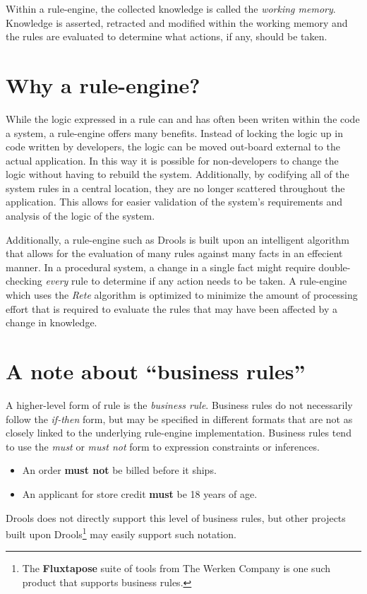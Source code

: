 Within a rule-engine, the collected knowledge is called the
\emph{working memory}.  Knowledge is
asserted, retracted and modified within the working memory and the
rules are evaluated to determine what actions, if any, should be
taken.

\section{Why a rule-engine?}

While the logic expressed in a rule can and has often been writen
within the code a system, a rule-engine offers many benefits.  Instead
of locking the logic up in code written by developers, the logic can
be moved out-board external to the actual application.  In this way
it is possible for non-developers to change the logic without having
to rebuild the system.  Additionally, by codifying all of the system
rules in a central location, they are no longer scattered throughout
the application.  This allows for easier validation of the system's
requirements and analysis of the logic of the system.

Additionally, a rule-engine such as Drools is built upon an
intelligent algorithm that allows for the evaluation of many
rules against many facts in an effecient manner.  In a procedural
system, a change in a single fact might require double-checking
\emph{every} rule to determine if any action needs to be taken.
A rule-engine which uses the \emph{Rete} algorithm
is optimized to minimize the amount of processing effort that is
required to evaluate the rules that may have been affected by
a change in knowledge.

\section{A note about ``business rules''}

A higher-level form of rule is the \emph{business rule}.  Business rules do not necessarily follow the \emph{if-then}
form, but may be specified in different formats that are not as
closely linked to the underlying rule-engine implementation.  Business
rules tend to use the \emph{must} or \emph{must not} form to
expression constraints or inferences.

\begin{itemize}
  \item An order \textbf{must not} be billed before it ships.
  \item An applicant for store credit \textbf{must} be 18 years of age.
\end{itemize}

Drools does not directly support this level of business rules, but
other projects built upon Drools\footnote{The
\textbf{Fluxtapose}
suite of tools from The Werken Company is one such product that
supports business rules.} may easily support such
notation.

